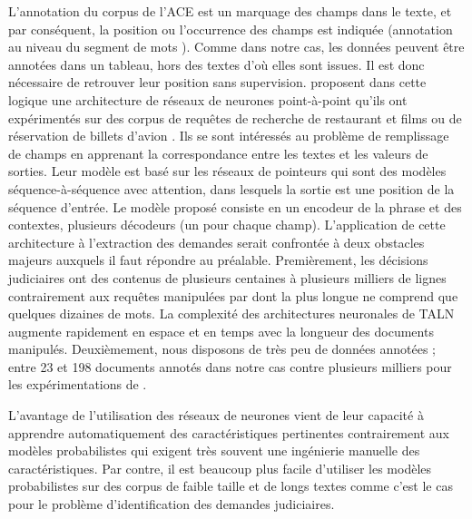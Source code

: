 L'annotation du corpus de l'ACE est un marquage des champs dans le texte, et par conséquent, la position ou l'occurrence des champs est indiquée (\og annotation au niveau du segment de mots \fg{}). Comme dans notre cas, les données peuvent être annotées dans un tableau, hors des textes d'où elles sont issues. Il est donc nécessaire de retrouver leur position sans supervision. \citet{palm2017e2e-dnn} proposent dans cette logique une architecture de réseaux de neurones point-à-point qu'ils ont expérimentés sur des corpus de requêtes de recherche de restaurant et films \citep{liu2013mitmovierestaurant} ou de réservation de billets d'avion \citep{price1990atis}. Ils se sont intéressés au problème de remplissage de champs en apprenant la correspondance entre les textes et les valeurs de sorties. Leur modèle est basé sur les réseaux de pointeurs \citep{vinyals2015pointernetworks} qui sont des modèles séquence-à-séquence avec attention, dans lesquels la sortie est une position de la séquence d'entrée. Le modèle proposé consiste en un encodeur de la phrase et des contextes, plusieurs décodeurs (un pour chaque champ). L'application de cette architecture à l'extraction des demandes serait confrontée à deux obstacles majeurs auxquels il faut répondre au préalable. Premièrement, les décisions judiciaires ont des contenus de plusieurs centaines à plusieurs milliers de lignes contrairement aux requêtes manipulées par \citet{palm2017e2e-dnn} dont la plus longue ne comprend que quelques dizaines de mots. La complexité des architectures neuronales de TALN augmente rapidement en espace et en temps avec la longueur des documents manipulés. Deuxièmement, nous disposons de très peu de données annotées ; entre 23 et 198 documents annotés dans notre cas contre plusieurs milliers pour les expérimentations de \citet{palm2017e2e-dnn}.

L'avantage de l'utilisation des réseaux de neurones vient de leur capacité à apprendre automatiquement des caractéristiques pertinentes contrairement aux modèles probabilistes qui exigent très souvent une ingénierie manuelle des caractéristiques. Par contre, il est beaucoup plus facile d'utiliser les modèles probabilistes sur des corpus de faible taille et de longs textes comme c'est le cas pour le problème d'identification des demandes judiciaires.


